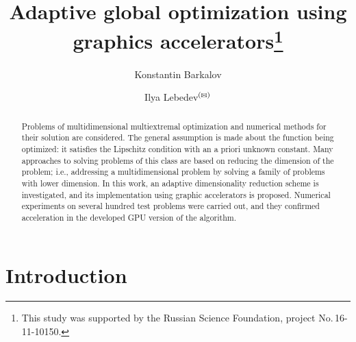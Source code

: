 \documentclass{svproc}
\def\orcidID#1{\unskip$^{[#1]}$}
\def\letter{$^{\textrm{(\Letter)}}$}
\begin{document}
\mainmatter              %
%
\title{Adaptive global optimization using graphics accelerators\thanks{This study was supported by the Russian Science Foundation, project No.\,16-11-10150.}
}
%
%
\author{Konstantin Barkalov%
\and Ilya Lebedev\letter%
}

%
%
%
	
\maketitle              %

\begin{abstract}

Problems of multidimensional multiextremal optimization and numerical methods for their solution are considered. The general assumption is made about the function being optimized: it satisfies the Lipschitz condition with an a priori unknown constant. Many approaches to solving problems of this class are based on reducing the dimension of the problem; i.e., addressing a multidimensional problem by solving a family of problems with lower dimension. In this work, an adaptive dimensionality reduction scheme is investigated, and its implementation using graphic accelerators is proposed. Numerical experiments on several hundred test problems were carried out, and they confirmed acceleration in the developed GPU version of the algorithm.


\end{abstract}

\section{Introduction}
\end{document}
